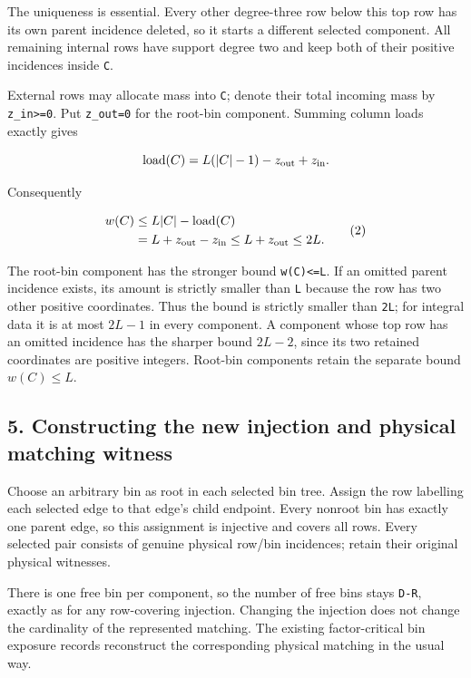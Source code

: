 The uniqueness is essential. Every other degree-three row below this top row has its own parent incidence deleted, so it starts a different selected component. All remaining internal rows have support degree two and keep both of their positive incidences inside \texttt{C}.

External rows may allocate mass into \texttt{C}; denote their total incoming mass by \texttt{z\_in\textgreater{}=0}. Put \texttt{z\_out=0} for the root-bin component. Summing column loads exactly gives

\[
\mathrm{load}(C)=L(|C|-1)-z_{\rm out}+z_{\rm in}.
\]

Consequently

\[
\begin{aligned}
 w(C)
 &\le L|C|-\mathrm{load}(C)\\
 &=L+z_{\rm out}-z_{\rm in}
 \le L+z_{\rm out}\le2L.
\end{aligned}
\tag{2}
\]

The root-bin component has the stronger bound \texttt{w(C)\textless{}=L}. If an omitted parent incidence exists, its amount is strictly smaller than \texttt{L} because the row has two other positive coordinates. Thus the bound is strictly smaller than \texttt{2L}; for integral data it is at most \(2L-1\) in every component. A component whose top row has an omitted incidence has the sharper bound \(2L-2\), since its two retained coordinates are positive integers. Root-bin components retain the separate bound \(w(C)≤L\).

\hypertarget{af-c467a6f0ad-constructing-the-new-injection-and-physical-matching-witness}{%
\subsection{5. Constructing the new injection and physical matching witness}\label{af-c467a6f0ad-constructing-the-new-injection-and-physical-matching-witness}}

Choose an arbitrary bin as root in each selected bin tree. Assign the row labelling each selected edge to that edge's child endpoint. Every nonroot bin has exactly one parent edge, so this assignment is injective and covers all rows. Every selected pair consists of genuine physical row/bin incidences; retain their original physical witnesses.

There is one free bin per component, so the number of free bins stays \texttt{\textbar{}D\textbar{}-\textbar{}R\textbar{}}, exactly as for any row-covering injection. Changing the injection does not change the cardinality of the represented matching. The existing factor-critical bin exposure records reconstruct the corresponding physical matching in the usual way.

